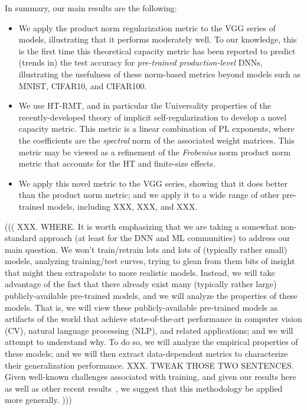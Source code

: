 In summary, our main results are the following:
\begin{itemize}
\item
We apply the product norm regularization metric to the VGG series of models, illustrating that it performs moderately well.
To our knowledge, this is the first time this theoretical capacity metric has been reported to predict (trends in) the test accuracy for \emph{pre-trained production-level} DNNs, illustrating the usefulness of these norm-based metrics beyond models such as MNIST, CIFAR10, and CIFAR100. 
\item
We use HT-RMT, and in particular the Universality properties of the recently-developed theory of implicit self-regularization to develop a novel capacity metric.
This metric is a linear combination of PL exponents, where the coefficients are the \emph{spectral} norm of the associated weight matrices.
This metric may be viewed as a refinement of the \emph{Frobenius} norm product norm metric that accounts for the HT and finite-size effects.
\item
We apply this novel metric to the VGG series, showing that it does better than the product norm metric; and we apply it to a wide range of other pre-trained models, including XXX, XXX, and XXX.
\end{itemize}

\noindent
(((
XXX.  WHERE.
It is worth emphasizing that we are taking a somewhat non-standard approach (at least for the DNN and ML communities) to address our main question.
We won't train/retrain lots and lots of (typically rather small) models, analyzing training/test curves, trying to glean from them bits of insight that might then extrapolate to more realistic models.
Instead, we will take advantage of the fact that there already exist many (typically rather large) publicly-available pre-trained models, and we will analyze the properties of these models.
That is, we will view these publicly-available pre-trained models as artifacts of the world that achieve state-of-the-art performance in computer vision (CV), natural language processing (NLP), and related applications; and we will attempt to understand why.
To do so, we will analyze the empirical properties of these models; 
and we will then extract data-dependent metrics to characterize their generalization performance.
XXX.  TWEAK THOSE TWO SENTENCES.
Given well-known challenges associated with training, and given our results here as well as other recent results~\cite{MM18_TR}, we suggest that this methodology be applied more generally.
)))


